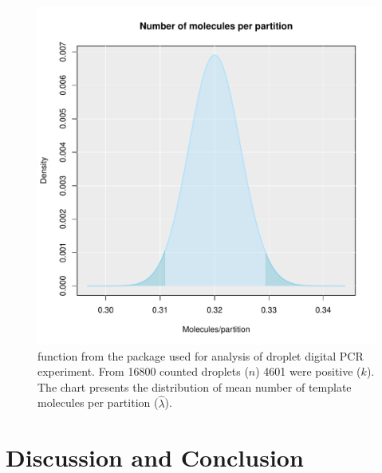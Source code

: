 \begin{figure}[htbp]
  \centering
  \includegraphics[clip=true, width=14cm]{figures/dpcR.pdf}
  \caption{ function from the  package used 
for analysis of droplet digital PCR experiment. From 16800 counted droplets 
($n$) 4601 were positive ($k$). The chart presents the distribution of mean number of 
template molecules per partition ($\hat \lambda$). 
}
  \label{figure:dpcR}
\end{figure}

\section{Discussion and Conclusion}

